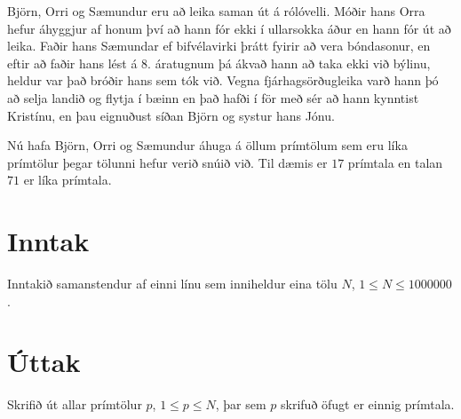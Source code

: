 

Björn, Orri og Sæmundur eru að leika saman út á rólóvelli. Móðir hans Orra
hefur áhyggjur af honum því að hann fór ekki í ullarsokka áður en hann fór út
að leika. Faðir hans Sæmundar ef bifvélavirki þrátt fyirir að vera bóndasonur,
en eftir að faðir hans lést á 8. áratugnum þá ákvað hann að taka ekki við
býlinu, heldur var það bróðir hans sem tók við. Vegna fjárhagsörðugleika varð
hann þó að selja landið og flytja í bæinn en það hafði í för með sér að hann
kynntist Kristínu, en þau eignuðust síðan Björn og systur hans Jónu.

Nú hafa Björn, Orri og Sæmundur áhuga á öllum prímtölum sem eru líka prímtölur
þegar tölunni hefur verið snúið við. Til dæmis er $17$ prímtala en talan $71$ er líka
prímtala.

\section*{Inntak}
Inntakið samanstendur af einni línu sem inniheldur eina tölu $N$, $1 \leq N \leq 1000000$.

\section*{Úttak}
Skrifið út allar prímtölur $p$, $1 \leq p \leq N$, þar sem $p$ skrifuð öfugt er einnig prímtala.
